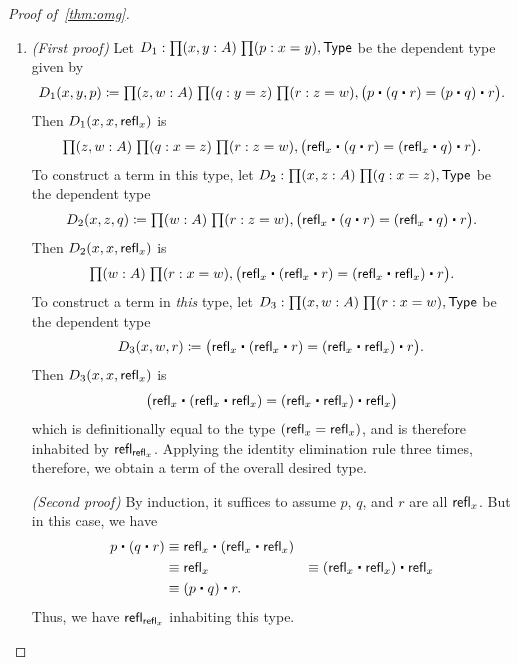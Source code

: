 \begin{proof}[Proof of~\autoref{thm:omg}]
\begin{enumerate}
    \noindent \emph{(Second proof)} By induction, it suffices to assume $p$ is $\refl x$.
    But in this case, we have $\opp{\opp{p}}\jdeq \opp{\opp{\refl x}} \jdeq \refl x$.
  \item \emph{(First proof)} Let $D_1:\prd{x,y:A}{p:x=y} \type$ be the dependent type given by
    \begin{equation*}
      D_1(x,y,p)\defeq\prd{z,w:A}{q:y= z}{r:z= w} \big(p\ct (q\ct r)=  (p\ct q)\ct r\big).
    \end{equation*}
    Then $D_1(x,x,\mathsf{refl}_{x})$ is
    \begin{equation*}
      \prd{z,w:A}{q:x= z}{r:z= w} \big(\refl{x}\ct(q\ct r)= (\refl{x}\ct q)\ct r\big).
    \end{equation*}
    To construct a term in this type, let $D_2:\prd{x,z:A}{q:x=z} \type$ be the dependent type
    \begin{equation*}
      D_2 (x,z,q) \defeq \prd{w:A}{r:z=w} \big(\refl{x}\ct(q\ct r)= (\refl{x}\ct q)\ct r\big).
    \end{equation*}
    Then $D_2(x,x,\mathsf{refl}_{x})$ is
    \begin{equation*}
      \prd{w:A}{r:x=w} \big(\refl{x}\ct(\refl{x}\ct r)= (\refl{x}\ct \refl{x})\ct r\big).
    \end{equation*}
    To construct a term in \emph{this} type, let $D_3:\prd{x,w:A}{r:x=w} \type$ be the dependent type
    \begin{equation*}
      D_3(x,w,r) \defeq \big(\refl{x}\ct(\refl{x}\ct r)= (\refl{x}\ct \refl{x})\ct r\big).
    \end{equation*}
    Then $D_3(x,x,\mathsf{refl}_{x})$ is
    \begin{equation*}
      \big(\refl{x}\ct(\refl{x}\ct \refl{x})= (\refl{x}\ct \refl{x})\ct \refl{x}\big)
    \end{equation*}
    which is definitionally equal to the type $(\mathsf{refl}_{x} = \mathsf{refl}_{x})$, and is therefore inhabited by $\mathsf{refl}_{\mathsf{refl}_{x}}$.
    Applying the identity elimination rule three times, therefore, we obtain a term of the overall desired type.

    \noindent \emph{(Second proof)} By induction, it suffices to assume $p$, $q$, and $r$ are all $\refl x$.
    But in this case, we have
    \begin{align*}
      p\ct (q\ct r)
      &\jdeq \refl{x}\ct(\refl{x}\ct \refl{x})\\
      &\jdeq \refl{x}
      &\jdeq (\refl{x}\ct \refl x)\ct \refl x\\
      &\jdeq (p\ct q)\ct r.
    \end{align*}
    Thus, we have $\mathsf{refl}_{\mathsf{refl}_{x}}$ inhabiting this type.\qedhere
  \end{enumerate}
\end{proof}

